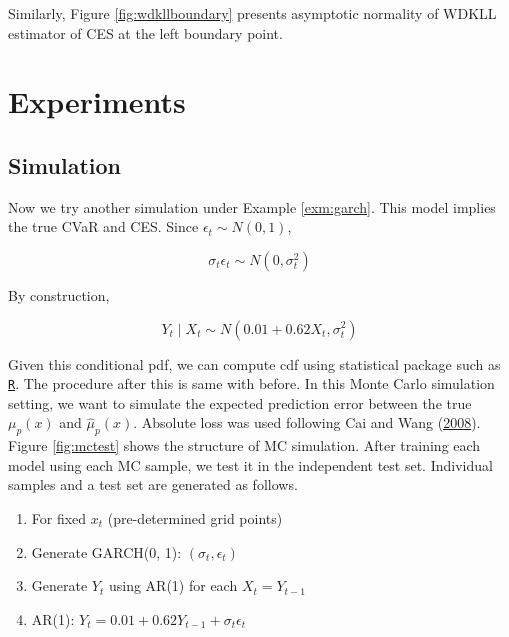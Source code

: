 \documentclass[
]{article}
\providecommand{\tightlist}{%
  \setlength{\itemsep}{0pt}\setlength{\parskip}{0pt}}
\theoremstyle{definition}
\theoremstyle{definition}
\theoremstyle{definition}
\theoremstyle{remark}
\begin{document}
Similarly, Figure \ref{fig:wdkllboundary} presents asymptotic normality of WDKLL estimator of CES at the left boundary point.

\hypertarget{experiment}{%
\section{Experiments}\label{experiment}}

\hypertarget{simulation}{%
\subsection{Simulation}\label{simulation}}

Now we try another simulation under Example \ref{exm:garch}. This model implies the true CVaR and CES. Since \(\epsilon_t \sim N(0, 1)\),

\begin{equation}
  \sigma_t \epsilon_t \sim N(0, \sigma_t^2)
  \label{eq:garchterm}
\end{equation}

By construction,

\begin{equation}
  Y_t \mid X_t \sim N \left( 0.01 + 0.62 X_t, \sigma_t^2 \right)
  \label{eq:arterm}
\end{equation}

Given this conditional pdf, we can compute cdf using statistical package such as \href{https://www.r-project.org}{\texttt{R}}. The procedure after this is same with before. In this Monte Carlo simulation setting, we want to simulate the expected prediction error between the true \(\mu_p(x)\) and \(\hat\mu_p(x)\). Absolute loss was used following Cai and Wang (\protect\hyperlink{ref-cai:2008aa}{2008}). Figure \ref{fig:mctest} shows the structure of MC simulation. After training each model using each MC sample, we test it in the independent test set. Individual samples and a test set are generated as follows.

\begin{enumerate}
\def\labelenumi{\arabic{enumi}.}
\tightlist
\item
  For fixed \(x_t\) (pre-determined grid points)
\item
  Generate GARCH(0, 1): \((\sigma_t, \epsilon_t)\)
\item
  Generate \(Y_t\) using AR(1) for each \(X_t = Y_{t - 1}\)
\item
  AR(1): \(Y_t = 0.01 + 0.62 Y_{t - 1} + \sigma_t \epsilon_t\)
\end{enumerate}
\end{document}
